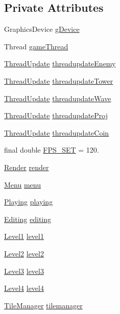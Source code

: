 \subsection*{Private Attributes}
\begin{DoxyCompactItemize}
\item 
Graphics\+Device \hyperlink{classprogetto_1_1_game_ac345e138a6ffa68544b48dc4d805626d}{g\+Device}
\item 
Thread \hyperlink{classprogetto_1_1_game_a226fef5c7cbae0baee66cb8355514596}{game\+Thread}
\item 
\hyperlink{classprogetto_1_1_thread_update}{Thread\+Update} \hyperlink{classprogetto_1_1_game_a025c688d1ff09f00db19a2552e75a023}{threadupdate\+Enemy}
\item 
\hyperlink{classprogetto_1_1_thread_update}{Thread\+Update} \hyperlink{classprogetto_1_1_game_a0cafc0f6e57fb42b0eb7ae0327ae6cb9}{threadupdate\+Tower}
\item 
\hyperlink{classprogetto_1_1_thread_update}{Thread\+Update} \hyperlink{classprogetto_1_1_game_a5f563a8c12d7677bba700f732a0ef434}{threadupdate\+Wave}
\item 
\hyperlink{classprogetto_1_1_thread_update}{Thread\+Update} \hyperlink{classprogetto_1_1_game_a685c7cbed1380c3a5f1debbedf6df3db}{threadupdate\+Proj}
\item 
\hyperlink{classprogetto_1_1_thread_update}{Thread\+Update} \hyperlink{classprogetto_1_1_game_ab0d4dd15edc502306a52e4020db4f1b2}{threadupdate\+Coin}
\item 
final double \hyperlink{classprogetto_1_1_game_a50d447db9f34844bb620b5f2445d0172}{F\+P\+S\+\_\+\+S\+ET} = 120.
\item 
\hyperlink{classprogetto_1_1_render}{Render} \hyperlink{classprogetto_1_1_game_a89f9872225fb9f22781342463fb2efe5}{render}
\item 
\hyperlink{classscenes_1_1_menu}{Menu} \hyperlink{classprogetto_1_1_game_a2ad0f4be462ff63c3c72779e80988d15}{menu}
\item 
\hyperlink{classscenes_1_1_playing}{Playing} \hyperlink{classprogetto_1_1_game_a244868866c8dc3e5d6170358b29b7ddd}{playing}
\item 
\hyperlink{classscenes_1_1_editing}{Editing} \hyperlink{classprogetto_1_1_game_a38f9dcf960197192269b03c788903b3e}{editing}
\item 
\hyperlink{classscenes_1_1_level1}{Level1} \hyperlink{classprogetto_1_1_game_a3e383190df624f9eb3a217146d06a1e0}{level1}
\item 
\hyperlink{classscenes_1_1_level2}{Level2} \hyperlink{classprogetto_1_1_game_a5925992aaa9203be9dc37a92b1d7d2f5}{level2}
\item 
\hyperlink{classscenes_1_1_level3}{Level3} \hyperlink{classprogetto_1_1_game_a6847c09aaed051c28279abdbca58cb1c}{level3}
\item 
\hyperlink{classscenes_1_1_level4}{Level4} \hyperlink{classprogetto_1_1_game_aa468e4210478204f1cff1ab951008767}{level4}
\item 
\hyperlink{classmanagers_1_1_tile_manager}{Tile\+Manager} \hyperlink{classprogetto_1_1_game_a6d3aeeb21b7d0a3598a949b8c244f7bf}{tilemanager}
\end{DoxyCompactItemize}


